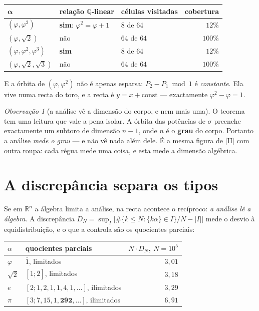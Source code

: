 \documentclass[11pt,a4paper]{article}
\theoremstyle{plain}
\theoremstyle{definition}
\theoremstyle{remark}
\newtheorem{obs}[teorema]{Observação}
\newcommand{\R}{\mathbb{R}}
\newcommand{\Q}{\mathbb{Q}}
\begin{document}
\begin{center}\small
\begin{tabular}{lllr}
\hline
$\boldsymbol\alpha$ & relação $\Q$-linear & células visitadas & cobertura \\ \hline
$(\varphi,\varphi^2)$ & \textbf{sim}: $\varphi^2=\varphi+1$ & $8$ de $64$ & $12\%$ \\
$(\varphi,\sqrt2)$ & não & $64$ de $64$ & $100\%$ \\
$(\varphi,\varphi^2,\varphi^3)$ & \textbf{sim} & $8$ de $64$ & $12\%$ \\
$(\varphi,\sqrt2,\sqrt3)$ & não & $64$ de $64$ & $100\%$ \\
\hline
\end{tabular}
\end{center}

\noindent E a órbita de $(\varphi,\varphi^2)$ não é apenas esparsa: $P_2-P_1 \bmod 1$ é
\emph{constante}. Ela vive numa recta do toro, e a recta é $y = x + \text{const}$ --- exactamente
$\varphi^2-\varphi=1$.

\begin{obs}[a análise vê a dimensão do corpo, e nem mais uma]\label{obs:vedimensao}
O teorema tem uma leitura que vale a pena isolar. A órbita das potências de $\sigma$ preenche
exactamente um subtoro de dimensão $n-1$, onde $n$ é o \textbf{grau} do corpo. Portanto a análise
\emph{mede o grau} --- e não vê nada além dele. É a mesma figura de [II] com outra roupa: cada régua
mede uma coisa, e esta mede a dimensão algébrica.
\end{obs}

\section{A discrepância separa os tipos}\label{sec:discrep}

Se em $\R^n$ a álgebra limita a análise, na recta acontece o recíproco: \emph{a análise lê a
álgebra}. A discrepância $D_N = \sup_I \big| \#\{k\leq N: \{k\alpha\}\in I\}/N - |I| \big|$ mede o
desvio à equidistribuição, e o que a controla são os quocientes parciais:

\begin{center}\small
\begin{tabular}{llr}
\hline
$\alpha$ & quocientes parciais & $N\cdot D_N$, $N=10^5$ \\ \hline
$\varphi$ & $\overline1$, limitados & $3{,}01$ \\
$\sqrt2$ & $[1;\overline2]$, limitados & $3{,}18$ \\
$e$ & $[2;1,2,1,1,4,1,\dots]$, ilimitados & $3{,}29$ \\
$\pi$ & $[3;7,15,1,\mathbf{292},\dots]$, ilimitados & $6{,}91$ \\
\hline
\end{tabular}
\end{center}
\end{document}
